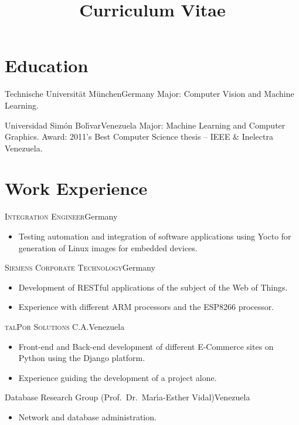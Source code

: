 \documentclass[10pt]{moderncv}
\title{Curriculum Vitae}
\begin{document}
\maketitle

\section{Education}

  {Technische Universit\"at M\"unchen}{Germany}{}{%
    Major: Computer Vision and Machine Learning.
  }

  {Universidad Sim\'on Bol\'{\i}var}{Venezuela}{}{%
    Major: Machine Learning and Computer Graphics.
    \newline
    Award: 2011's Best Computer Science thesis -- IEEE \& Inelectra Venezuela.
  }

\section{Work Experience}

{\textsc{Integration Engineer}}{Germany}{}{%
\begin{itemize}
    \item Testing automation and integration of software applications using Yocto 
      for generation of Linux images for embedded devices.
\end{itemize}
}

{\textsc{Siemens Corporate Technology}}{Germany}{}{%
\begin{itemize}
  \item Development of RESTful applications of the subject of the Web of Things.
  \item Experience with different ARM processors and the ESP8266 processor.
\end{itemize}
}

{\textsc{talPor Solutions C.A.}}{Venezuela}{}{%
\begin{itemize}
  \item Front-end and Back-end development of different E-Commerce sites
    on Python using the Django platform.
  \item Experience guiding the development of a project alone.
\end{itemize}
}

{Database Research Group (Prof.\ Dr.\ Mar\'{\i}a-Esther Vidal)}{Venezuela}{}{%
\begin{itemize}
  \item Network and database administration.
\end{itemize}
}
\end{document}
